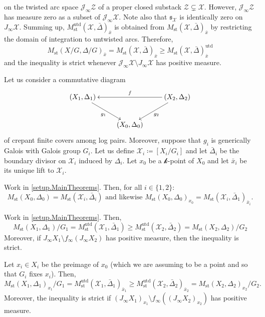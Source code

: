 \documentclass[12pt]{amsart}
\theoremstyle{plain}   %
\theoremstyle{definition}    %
\theoremstyle{remark}    %
\numberwithin{equation}{theorem}
\DeclareMathOperator{\st}{\mathrm{st}}
\DeclareMathOperator{\utd}{\mathrm{utd}}
\newcommand{\kay}{\mathcal{k}}
\newcommand{\sJ}{\mathcal{J}}
\newcommand{\sX}{\mathcal{X}}
\newcommand{\sZ}{\mathcal{Z}}
\begin{document}
on the twisted arc space $\sJ_\infty \sZ$ of a proper closed substack $\sZ \subsetneq \sX$. However, $\sJ_\infty \sZ$ has measure zero as a subset of $\sJ_\infty \sX$. Note also that $\mathfrak{s}_\sX$ is identically zero on $J_\infty \sX$. Summing up, $M_{\st}^{\utd}(\sX, \bar{\Delta})_{\bar x}$ is obtained from $M_{\st}(\sX, \bar{\Delta})_{\bar x}$ by restricting the domain of integration to untwisted arcs.  Therefore,
\[
M_{\st}(X/G, \Delta/G)_{\bar{x}} = M_{\st}(\sX, \bar{\Delta})_{\bar x} \ge M_{\st}(\sX, \bar{\Delta})_{\bar x}^{\utd}
\]
and the inequality is strict whenever  $\sJ_\infty \sX\setminus J_\infty \sX$ has positive measure.
\begin{setup} \label{setup.MainTheorems}
Let us consider a commutative diagram
\[
\xymatrix{
(X_1,\Delta_1)  \ar[dr]_-{g_1}& & (X_2,\Delta_2) \ar[ll]_-{f} \ar[dl]^-{g_2}\\
&(X_0,\Delta_0)&
}\]
of crepant finite covers among log pairs. Moreover, suppose that $g_i$ is generically Galois with Galois group $G_i$. Let us define $\sX_i\coloneqq[X_i/G_i]$ and let $\bar{\Delta}_i$ be the boundary divisor on $\sX_i$ induced by $\Delta_i$. Let $x_0$ be a $\kay$-point of $X_0$ and let $\bar{x}_i$ be its unique lift to $\sX_i$.
\end{setup}

\begin{proposition}
Work in \autoref{setup.MainTheorems}. Then, for all $i \in \{1,2\}$:
 \[
 M_{\st}(X_0,\Delta_0)=M_{\st}(\sX_i,\bar{\Delta}_i)
\text{ and likewise }
M_{\st}(X_0,\Delta_0)_{x_0}=M_{\st}(\sX_i,\bar{\Delta}_1)_{\bar{x}_i}.
 \]
\end{proposition}

\begin{corollary} \label{cor.KeyCorollary}
Work in \autoref{setup.MainTheorems}. Then, 
\[
M_{\st}(X_1,\Delta_1)/G_1 
=
M_{\st}^{\utd}(\sX_1,\bar{\Delta}_1)
\ge 
M_{\st}^{\utd}(\sX_2,\bar{\Delta}_2)
=
M_{\st}(X_2,\Delta_2)/G_2
\]
Moreover, if $J_\infty X_1 \setminus f_\infty (J_\infty X_2)$ has positive measure, then the inequality is strict. 

Let $x_i\in X_i$ be the preimage of $x_0$ (which we are assuming to be a point and so that $G_i$ fixes $x_i$). Then,
\[
M_{\st}(X_1,\Delta_1)_{x_1}/G_1 
=
M_{\st}^{\utd}(\sX_1,\bar{\Delta}_1)_{\bar{x}_1} 
\ge  
M_{\st}^{\utd}(\sX_2,\bar{\Delta}_2)_{\bar{x}_2}
=
M_{\st}(X_2,\Delta_2)_{x_2}/G_2.
\]
Moreover, the inequality is strict if $(J_\infty X_1)_{x_1} \setminus f_\infty ((J_\infty X_2)_{x_2})$ has positive measure.
\end{corollary}
\end{document}
